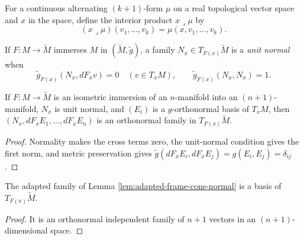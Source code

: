 \begin{definition}
\label{def:interior-multiplication}
\leanok
For a continuous alternating $(k+1)$-form $\mu$ on a real topological vector space and $x$ in the space, define the interior product $x\lrcorner\mu$ by
\[
(x\lrcorner\mu)(v_1,\ldots,v_k)=\mu(x,v_1,\ldots,v_k).
\]
\end{definition}

\begin{definition}
\label{def:unit-normal}
\leanok
{}
If $F:M\to\widetilde M$ immerses $M$ in $(\widetilde M,\widetilde g)$, a family $N_x\in T_{F(x)}\widetilde M$ is a \emph{unit normal} when
\[
\widetilde g_{F(x)}(N_x,dF_xv)=0\quad(v\in T_xM),\qquad \widetilde g_{F(x)}(N_x,N_x)=1.
\]
\end{definition}

\begin{lemma}
\label{lem:adapted-frame-cons-normal}
\leanok
{}
If $F:M\to\widetilde M$ is an isometric immersion of an $n$-manifold into an $(n+1)$-manifold, $N_x$ is unit normal, and $(E_i)$ is a $g$-orthonormal basis of $T_xM$, then $(N_x,dF_xE_1,\ldots,dF_xE_n)$ is an orthonormal family in $T_{F(x)}\widetilde M$.
\end{lemma}

\begin{proof}
\leanok
{}
\sketch Normality makes the cross terms zero, the unit-normal condition gives the first norm, and metric preservation gives $\widetilde g(dF_xE_i,dF_xE_j)=g(E_i,E_j)=\delta_{ij}$.
\end{proof}

\begin{lemma}
\label{lem:adapted-frame-ambient-basis}
\leanok
{}
The adapted family of Lemma \ref{lem:adapted-frame-cons-normal} is a basis of $T_{F(x)}\widetilde M$.
\end{lemma}

\begin{proof}
\leanok
{}
\sketch It is an orthonormal independent family of $n+1$ vectors in an $(n+1)$-dimensional space.
\end{proof}

